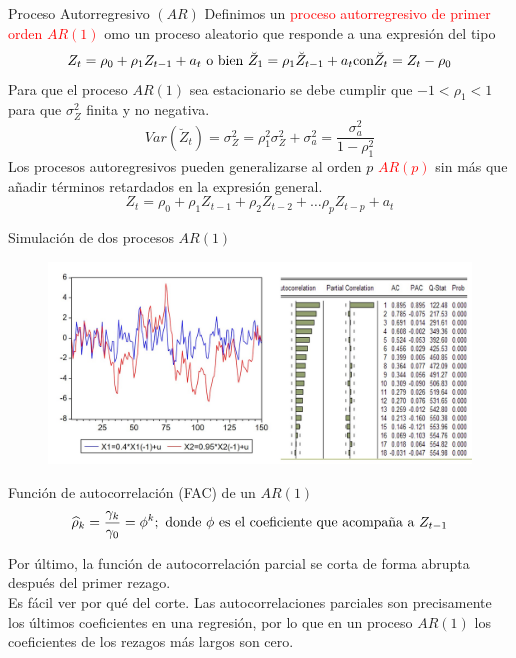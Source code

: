 \begin{frame}{Proceso Autorregresivo $(AR)$}
	Definimos un \textcolor{red}{proceso autorregresivo de primer orden $AR(1)$} omo un proceso aleatorio que responde a una expresión del tipo
		$$Z_t = \rho_0 + \rho_1 Z_{t-1} + a_t \textup{ o bien } \breve{Z}_{1} = \rho_1\breve{Z}_{t-1}+a_t \textup{con} \breve{Z}_{t} = Z_t - \rho_0$$
	Para que el proceso $AR(1)$ sea estacionario se debe cumplir que $-1<\rho_1<1$ para que $\sigma_{Z}^2$ finita y no negativa.
		$$Var(\breve{Z}_{t}) = \sigma_{Z}^2 = \rho_1^2\sigma_{Z}^2 + \sigma_{a}^2 = \frac{\sigma_{a}^2}{1-\rho_1^2}$$
	Los procesos autoregresivos pueden generalizarse al orden $p$ \textcolor{red}{$AR(p)$}  sin más que añadir términos retardados en la expresión general.
		$$Z_t = \rho_0 + \rho_1 Z_{t-1} + \rho_2 Z_{t-2} + \ldots \rho_p Z_{t-p} + a_t$$
\end{frame}
\begin{frame}{Simulación de dos procesos $AR(1)$}
	\centering
	\begin{figure}
		\includegraphics[width = 0.99\linewidth]{fig/figure8.jpg}
	\end{figure}
\end{frame}
\begin{frame}{Función de autocorrelación (FAC) de un $AR(1)$}
	$$\widehat{\rho}_k = \frac{\gamma_k}{\gamma_0}=\phi^{k}; \textup{ donde } \phi \textup{ es el coeficiente que acompaña a } Z_{t-1}$$
	
	Por último, la función de autocorrelación parcial se corta de forma abrupta después del primer rezago.\\
	
	Es fácil ver por qué del corte. Las autocorrelaciones parciales son precisamente los últimos coeficientes en una regresión, por lo que en un proceso $AR(1)$ los coeficientes de los rezagos más largos son cero.	
\end{frame}

